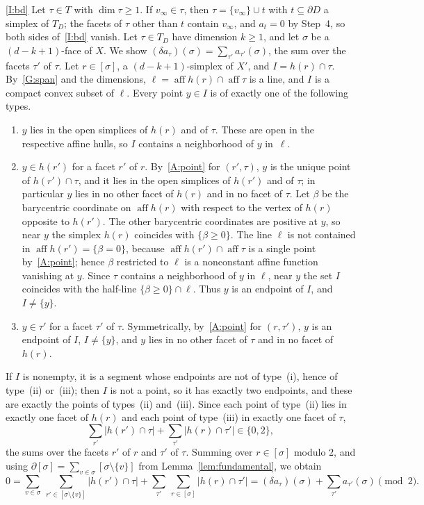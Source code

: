 \documentclass[11pt]{article}
\theoremstyle{definition}
\numberwithin{equation}{section}
\DeclareMathOperator{\aff}{aff}
\begin{document}
\ref{I:bd} Let $\tau\in T$ with $\dim\tau\ge1$. If $v_\infty\in\tau$, then $\tau=\{v_\infty\}\cup t$ with $t\subseteq\partial D$ a simplex of $T_D$; the facets of $\tau$ other than $t$ contain $v_\infty$, and $a_t=0$ by Step~4, so both sides of~\ref{I:bd} vanish. Let $\tau\in T_D$ have dimension $k\ge1$, and let $\sigma$ be a $(d-k+1)$-face of $X$. We show $(\delta a_\tau)(\sigma)=\sum_{\tau'}a_{\tau'}(\sigma)$, the sum over the facets $\tau'$ of $\tau$. Let $r\in[\sigma]$, a $(d-k+1)$-simplex of $X'$, and $I=h(r)\cap\tau$. By~\ref{G:span} and the dimensions, $\ell=\aff h(r)\cap\aff\tau$ is a line, and $I$ is a compact convex subset of $\ell$. Every point $y\in I$ is of exactly one of the following types.
\begin{enumerate}[label=\textup{(\roman*)}]
\item $y$ lies in the open simplices of $h(r)$ and of $\tau$. These are open in the respective affine hulls, so $I$ contains a neighborhood of $y$ in~$\ell$.
\item $y\in h(r')$ for a facet $r'$ of $r$. By~\ref{A:point} for $(r',\tau)$, $y$ is the unique point of $h(r')\cap\tau$, and it lies in the open simplices of $h(r')$ and of $\tau$; in particular $y$ lies in no other facet of $h(r)$ and in no facet of $\tau$. Let $\beta$ be the barycentric coordinate on $\aff h(r)$ with respect to the vertex of $h(r)$ opposite to $h(r')$. The other barycentric coordinates are positive at $y$, so near $y$ the simplex $h(r)$ coincides with $\{\beta\ge0\}$. The line $\ell$ is not contained in $\aff h(r')=\{\beta=0\}$, because $\aff h(r')\cap\aff\tau$ is a single point by~\ref{A:point}; hence $\beta$ restricted to $\ell$ is a nonconstant affine function vanishing at $y$. Since $\tau$ contains a neighborhood of $y$ in $\ell$, near $y$ the set $I$ coincides with the half-line $\{\beta\ge0\}\cap\ell$. Thus $y$ is an endpoint of $I$, and $I\ne\{y\}$.
\item $y\in\tau'$ for a facet $\tau'$ of $\tau$. Symmetrically, by~\ref{A:point} for $(r,\tau')$, $y$ is an endpoint of $I$, $I\ne\{y\}$, and $y$ lies in no other facet of $\tau$ and in no facet of~$h(r)$.
\end{enumerate}
If $I$ is nonempty, it is a segment whose endpoints are not of type~(i), hence of type~(ii) or~(iii); then $I$ is not a point, so it has exactly two endpoints, and these are exactly the points of types~(ii) and~(iii). Since each point of type~(ii) lies in exactly one facet of $h(r)$ and each point of type~(iii) in exactly one facet of $\tau$,
\begin{equation*}
 \sum_{r'}|h(r')\cap\tau|+\sum_{\tau'}|h(r)\cap\tau'|\in\{0,2\},
\end{equation*}
the sums over the facets $r'$ of $r$ and $\tau'$ of $\tau$. Summing over $r\in[\sigma]$ modulo $2$, and using $\partial[\sigma]=\sum_{v\in\sigma}[\sigma\setminus\{v\}]$ from Lemma~\ref{lem:fundamental}, we obtain
\begin{equation*}
 0=\sum_{v\in\sigma}\ \sum_{r'\in[\sigma\setminus\{v\}]}|h(r')\cap\tau|+\sum_{\tau'}\ \sum_{r\in[\sigma]}|h(r)\cap\tau'|=(\delta a_\tau)(\sigma)+\sum_{\tau'}a_{\tau'}(\sigma)\pmod2.
\end{equation*}
\end{document}
